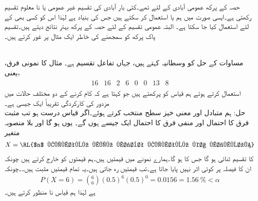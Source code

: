 
حصہ  کے پرکھ عمومی آبادی کے لئے تھے۔کئی بار آبادی کی تقسیم غیر عمومی یا نا معلوم تقسیم رکھتی ہے۔ایسی صورت  میں ہم  یا  استعمال کر سکتے ہیں جس کی بنیاد   ہے لہٰذا اس کو کسی بھی  کے لئے استعمال کیا جا سکتا ہے۔ البتہ عمومی تقسیم کے لئے حصہ 
 کے پرکھ بہتر نتائج دیتے ہیں۔تقسیم پاک پرکھ کو سمجھنے کی خاطر ایک مثال پر غور کرتے ہیں۔

\quad {}\\
مساوات  کے حل  کو وسطانیہ کہتے ہیں، جہاں  تفاعل تقسیم ہے۔ مثال  کا نمونی فرق، یعنی،
\begin{align*}
\begin{array}{cccccccc}
16&16&2&6&0&0&13&8
\end{array}
\end{align*}
استعمال کرتے ہوئے ہم قیاس  کو پرکھتے ہیں جو کہتا ہے کہ   کام کرنے کے دو مختلف حالات میں مزدور کی کارکردگی تقریباً ایک جیسی ہے۔\\
حل:\quad
ہم متبادل  اور معنی خیز سطح  منتخب کرتے ہوئے۔اگر قیاس درست ہو تب مثبت فرق کا احتمال  اور منفی فرق کا احتمال ایک جیسے ہوں گے۔ یوں  ہو گا اور بلا منصوبہ متغیر
\begin{align*}
X=\text{\RL{$n$ قیمتوں میں مثبت قیمتوں کا مجموعہ}}
\end{align*}
کا تقسیم ثنائی ہو گا جس کا  ہو گا۔ہمارے نمونے میں  قیمتیں ہیں۔ہم  قیمتوں کو خارج کرتے ہیں چونکہ ان کا فیصلہ پر کوئی اثر نہیں پایا جاتا ہے۔تب  قیمتیں رہ جاتی ہیں۔یہ تمام قیمتیں مثبت ہیں۔۔چونکہ
\begin{align*}
P(X=6)=\binom{6}{6} (0.5)^6(0.5)^0=0.0156=\SI{1.56}{\percent}<\alpha
\end{align*}
ہے لہٰذا ہم قیاس نا منظور کرتے ہیں۔

